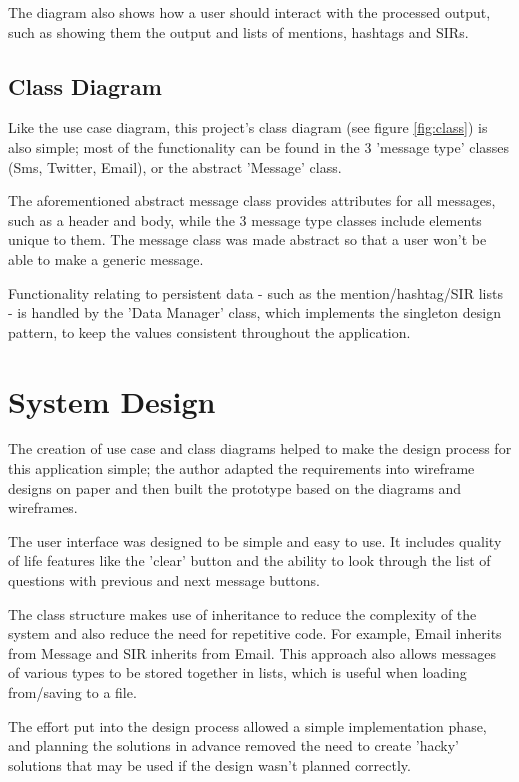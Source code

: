\documentclass[a4paper]{article}
\begin{document}
The diagram also shows how a user should interact with the processed output, such as showing them the output and lists of mentions, hashtags and SIRs.

\subsection{Class Diagram}
Like the use case diagram, this project's class diagram (see figure \ref{fig:class}) is also simple; most of the functionality can be found in the 3 'message type' classes (Sms, Twitter, Email), or the abstract 'Message' class.

The aforementioned abstract message class provides attributes for all messages, such as a header and body, while the 3 message type classes include elements unique to them. The message class was made abstract so that a user won't be able to make a generic message.

Functionality relating to persistent data - such as the mention/hashtag/SIR lists - is handled by the 'Data Manager' class, which implements the singleton design pattern, to keep the values consistent throughout the application.

\section{System Design}
\label{sec:systemdesign}
The creation of use case and class diagrams helped to make the design process for this application simple; the author adapted the requirements into wireframe designs on paper and then built the prototype based on the diagrams and wireframes.

The user interface was designed to be simple and easy to use. It includes quality of life features like the 'clear' button and the ability to look through the list of questions with previous and next message buttons. 

The class structure makes use of inheritance to reduce the complexity of the system and also reduce the need for repetitive code. For example, Email inherits from Message and SIR inherits from Email. This approach also allows messages of various types to be stored together in lists, which is useful when loading from/saving to a file.

The effort put into the design process allowed a simple implementation phase, and planning the solutions in advance removed the need to create 'hacky' solutions that may be used if the design wasn't planned correctly.
\end{document}
